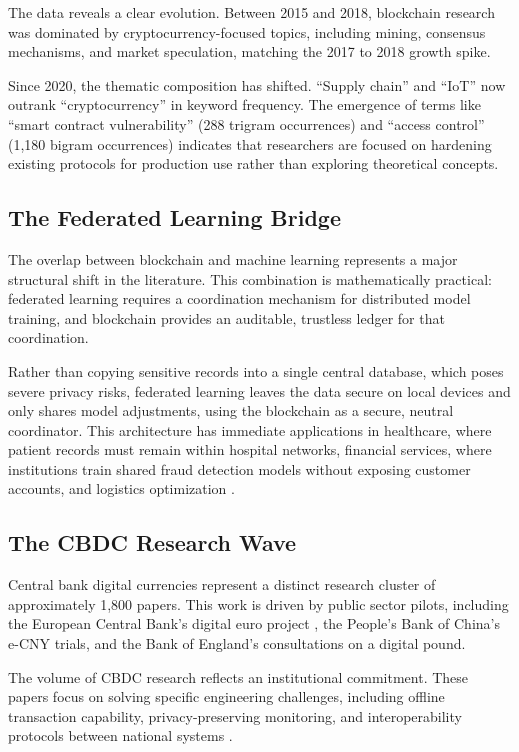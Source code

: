 \documentclass[11pt]{article}
\begin{document}
The data reveals a clear evolution. Between 2015 and 2018, blockchain research was dominated by cryptocurrency-focused topics, including mining, consensus mechanisms, and market speculation, matching the 2017 to 2018 growth spike.

Since 2020, the thematic composition has shifted. ``Supply chain'' and ``IoT'' now outrank ``cryptocurrency'' in keyword frequency. The emergence of terms like ``smart contract vulnerability'' (288 trigram occurrences) and ``access control'' (1,180 bigram occurrences) indicates that researchers are focused on hardening existing protocols for production use rather than exploring theoretical concepts.

\subsection{The Federated Learning Bridge}

The overlap between blockchain and machine learning represents a major structural shift in the literature. This combination is mathematically practical: federated learning requires a coordination mechanism for distributed model training, and blockchain provides an auditable, trustless ledger for that coordination.

Rather than copying sensitive records into a single central database, which poses severe privacy risks, federated learning leaves the data secure on local devices and only shares model adjustments, using the blockchain as a secure, neutral coordinator. This architecture has immediate applications in healthcare, where patient records must remain within hospital networks, financial services, where institutions train shared fraud detection models without exposing customer accounts, and logistics optimization \citep{saberi2019blockchain, tian2016agri}.

\subsection{The CBDC Research Wave}

Central bank digital currencies represent a distinct research cluster of approximately 1,800 papers. This work is driven by public sector pilots, including the European Central Bank's digital euro project \citep{ecb2024euro}, the People's Bank of China's e-CNY trials, and the Bank of England's consultations on a digital pound.

The volume of CBDC research reflects an institutional commitment. These papers focus on solving specific engineering challenges, including offline transaction capability, privacy-preserving monitoring, and interoperability protocols between national systems \citep{auer2021cbdcs}.
\end{document}
